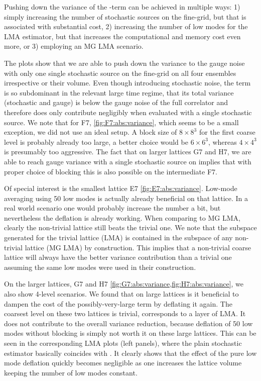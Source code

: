 Pushing down the variance of the -term can be achieved in multiple ways:
1) simply increasing the number of stochastic sources on the fine-grid, but that is associated with substantial cost,
2) increasing the number of low modes for the LMA estimator, but that increases the computational and memory cost even more,
or 3) employing an MG LMA scenario.

The plots show that we are able to push down the  variance to the gauge noise with only one single stochastic source on the fine-grid on all four ensembles irrespective or their volume.
Even though introducing stochastic noise, the  term is so subdominant in the relevant large time regime, that its total variance (stochastic and gauge) is below the gauge noise of the full correlator and therefore does only contribute negligibly when evaluated with a single stochastic source.
We note that for F7, \cref{fig:F7:abs:variance}, which seems to be a small exception, we did not use an ideal setup.
A block size of $8 \times 8^{3}$ for the first coarse level  is probably already too large, a better choice would be $6 \times 6^{3}$, whereas $4 \times 4^{3}$ is presumably too aggressive.
The fact that on larger lattices G7 and H7, we are able to reach gauge variance with a single stochastic source on  implies that with proper choice of blocking this is also possible on the intermediate F7.

Of special interest is the smallest lattice E7 \cref{fig:E7:abs:variance}.
Low-mode averaging using \num{50} low modes is actually already beneficial on that lattice.
In a real world scenario one would probably increase the number a bit, but nevertheless the deflation is already working.
When comparing to MG LMA, clearly the non-trivial lattice still beats the trivial one.
We note that the subspace generated for the trivial lattice (LMA) is contained in the subspace of any non-trivial lattice (MG LMA) by construction.
This implies that a non-trivial coarse lattice will always have the better variance contribution than a trivial one assuming the same low modes were used in their construction.

On the larger lattices, G7 and H7 \cref{fig:G7:abs:variance,fig:H7:abs:variance}, we also show 4-level scenarios.
We found that on large lattices is it beneficial to dampen the cost of the possibly-very-large  term by deflating it again.
The coarsest level on these two lattices is trivial, \ie corresponds to a layer of LMA.
It does not contribute to the overall variance reduction, because deflation of \num{50} low modes without blocking is simply not worth it on these large lattices.
This can be seen in the corresponding LMA plots (left panels), where the plain stochastic estimator basically coincides with .
It clearly shows that the effect of the pure low mode deflation quickly becomes negligible as one increases the lattice volume keeping the number of low modes constant.

